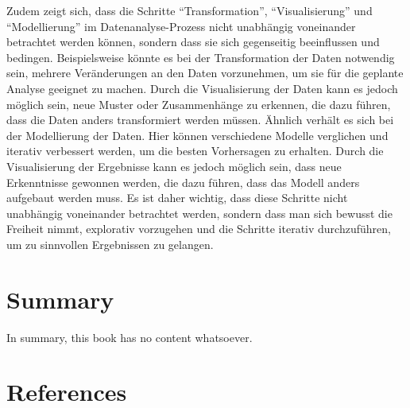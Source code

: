 \documentclass[
  letterpaper,
  DIV=11]{scrreprt}
\begin{document}
Zudem zeigt sich, dass die Schritte ``Transformation'',
``Visualisierung'' und ``Modellierung'' im Datenanalyse-Prozess nicht
unabhängig voneinander betrachtet werden können, sondern dass sie sich
gegenseitig beeinflussen und bedingen. Beispielsweise könnte es bei der
Transformation der Daten notwendig sein, mehrere Veränderungen an den
Daten vorzunehmen, um sie für die geplante Analyse geeignet zu machen.
Durch die Visualisierung der Daten kann es jedoch möglich sein, neue
Muster oder Zusammenhänge zu erkennen, die dazu führen, dass die Daten
anders transformiert werden müssen. Ähnlich verhält es sich bei der
Modellierung der Daten. Hier können verschiedene Modelle verglichen und
iterativ verbessert werden, um die besten Vorhersagen zu erhalten. Durch
die Visualisierung der Ergebnisse kann es jedoch möglich sein, dass neue
Erkenntnisse gewonnen werden, die dazu führen, dass das Modell anders
aufgebaut werden muss. Es ist daher wichtig, dass diese Schritte nicht
unabhängig voneinander betrachtet werden, sondern dass man sich bewusst
die Freiheit nimmt, explorativ vorzugehen und die Schritte iterativ
durchzuführen, um zu sinnvollen Ergebnissen zu gelangen.


\hypertarget{summary}{%
\chapter{Summary}\label{summary}}

In summary, this book has no content whatsoever.


\hypertarget{references}{%
\chapter*{References}\label{references}}

\end{document}
